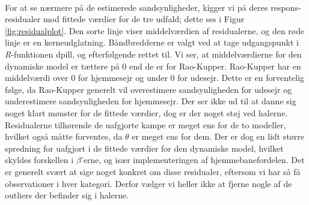 \documentclass[11pt,a4paper]{article}
\begin{document}
 \\
\newpage 
For at se nærmere på de estimerede sandsynligheder, kigger vi på deres respons-residualer mod fittede værdier for de tre udfald; dette ses i Figur \ref{fig:residualplot}. Den sorte linje viser middelværdien af residualerne, og den røde linje er en kerneudglatning. Båndbredderne er valgt ved at tage udgangspunkt i \textit{R}-funktionen {\selectfont dpill}, og efterfølgende rettet til. Vi ser, at middelværdierne for den dynamiske model er tættere på 0 end de er for Rao-Kupper. Rao-Kupper har en middelværdi over 0 for hjemmesejr og under 0 for udesejr. Dette er en forventelig følge, da Rao-Kupper generelt vil overestimere sandsynligheden for udesejr og underestimere sandsynligheden for hjemmesejr. Der ser ikke ud til at danne sig noget klart mønster for de fittede værdier, dog er der noget støj ved halerne. Residualerne tilhørende de uafgjorte kampe er meget ens for de to modeller, hvilket også måtte forventes, da $\theta$ er meget ens for dem. Der er dog en lidt større spredning for uafgjort i de fittede værdier for den dynamiske model, hvilket skyldes forskellen i $\beta$'erne, og især implementeringen af hjemmebanefordelen. Det er generelt svært at sige noget konkret om disse residualer, eftersom vi har så få observationer i hver kategori. Derfor vælger vi heller ikke at fjerne nogle af de outliers der befinder sig i halerne.
\end{document}
